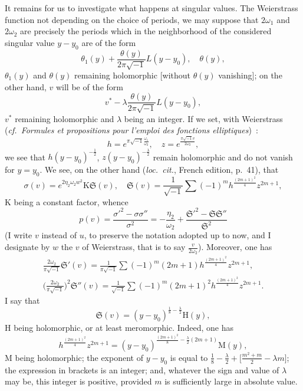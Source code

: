 \documentclass{article}
\begin{document}
It remains for us to investigate what happens at singular values. The Weierstrass function not depending on the choice of periods, we may suppose that $2\omega_{1}$ and $2\omega_{2}$ are precisely the periods which in the neighborhood of the considered singular value $y - y_{0}$ are of the form
\[
\theta_{1}(y) + \frac{\theta(y)}{2\pi\sqrt{-1}} L(y - y_{0}), \quad \theta(y),
\]
$\theta_{1}(y)$ and $\theta(y)$ remaining holomorphic [without $\theta(y)$ vanishing]; on the other hand, $v$ will be of the form
\[
v^{*} - \lambda \frac{\theta(y)}{2\pi\sqrt{-1}} L(y - y_{0}),
\]
$v^{*}$ remaining holomorphic and $\lambda$ being an integer. If we set, with Weierstrass (\emph{cf.~Formules et propositions pour l'emploi des fonctions elliptiques})~:
\[
h = e^{\pi\sqrt{-1} \frac{\omega_{1}}{\omega_{2}}}, \quad z = e^{\frac{\pi\sqrt{-1} v}{2\omega_{2}}},
\]
we see that $h(y - y_{0})^{-\frac{1}{2}}$, $z(y - y_{0})^{-\frac{\lambda}{2}}$ remain holomorphic and do not vanish for $y = y_{0}$. We see, on the other hand (\emph{loc.~cit.}, French edition, p.~41), that
\[
\sigma(v) = e^{2\eta_{2} \omega_{2} w^{2}} \mathrm{K} \mathfrak{S}(v), \quad \mathfrak{S}(v) = \frac{1}{\sqrt{-1}} \sum (-1)^{m} h^{\frac{(2m+1)^{2}}{4}} z^{2m+1},
\]
$\mathrm{K}$ being a constant factor, whence
\[
p(v) = \frac{\sigma'^{2} - \sigma\sigma''}{\sigma^{2}} = - \frac{\eta_{2}}{\omega_{2}} + \frac{\mathfrak{S}'^{2} - \mathfrak{S}\mathfrak{S}''}{\mathfrak{S}^{2}}
\]
(I write $v$ instead of $u$, to preserve the notation adopted up to now, and I designate by $w$ the $v$ of Weierstrass, that is to say $\frac{v}{2\omega_{2}}$). Moreover, one has
\[
\begin{gathered}
\frac{2\omega_{2}}{\pi\sqrt{-1}} \mathfrak{S}'(v) = \frac{1}{\pi\sqrt{-1}} \sum (-1)^{m} (2m+1) h^{\frac{(2m+1)^{2}}{4}} z^{2m+1}, \\
\biggl( \frac{2\omega_{2}}{\pi\sqrt{-1}} \biggr)^{2} \mathfrak{S}''(v) = \frac{1}{\sqrt{-1}} \sum (-1)^{m} (2m+1)^{2} h^{\frac{(2m+1)^{2}}{4}} z^{2m+1}.
\end{gathered}
\]
I say that
\[
\mathfrak{S}(v) = (y - y_{0})^{\frac{1}{8} - \frac{\lambda}{2}} \mathrm{H}(y),
\]
$\mathrm{H}$ being holomorphic, or at least meromorphic. Indeed, one has
\[
h^{\frac{(2m+1)^{2}}{4}} z^{2m+1} = (y - y_{0})^{\frac{(2m+1)^{2}}{8} - \frac{\lambda}{2}(2m+1)} \mathrm{M}(y),
\]
$\mathrm{M}$ being holomorphic; the exponent of $y - y_{0}$ is equal to $\frac{1}{8} - \frac{\lambda}{2} + \bigl[ \frac{m^{2} + m}{2} - \lambda m \bigr]$; the expression in brackets is an integer; and, whatever the sign and value of $\lambda$ may be, this integer is positive, provided $m$ is sufficiently large in absolute value.
\end{document}
